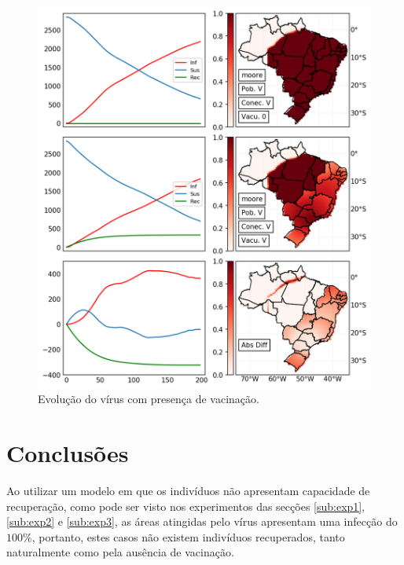 \documentclass[a4paper,12pt]{article}
\begin{document}
\begin{figure}[!ht]
 \begin{center}
  \includegraphics[width=1\linewidth]{fig/Vacuna.png}
 \end{center}
 \caption{Evolução do vírus com presença de vacinação.}
\label{figure:vacun}
\end{figure}

\newpage

\section{Conclusões}

Ao utilizar um modelo em que os indivíduos não apresentam capacidade de recuperação, como pode ser visto nos experimentos das secções \ref{sub:exp1}, \ref{sub:exp2} e \ref{sub:exp3}, as áreas atingidas pelo vírus apresentam uma infecção do $100\%$, portanto, estes casos não existem indivíduos recuperados, tanto naturalmente como pela ausência de vacinação. 
\end{document}
